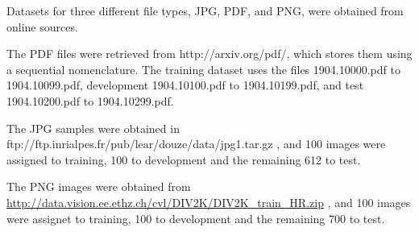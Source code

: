 Datasets for three different file types, JPG, PDF, and PNG, were obtained from online sources.

The PDF files were retrieved from http://arxiv.org/pdf/, which stores them using a sequential nomenclature. The training dataset uses the files 1904.10000.pdf to 1904.10099.pdf, development 1904.10100.pdf to 1904.10199.pdf, and test 1904.10200.pdf to 1904.10299.pdf. 

The JPG samples were obtained in ftp://ftp.inrialpes.fr/pub/lear/douze/data/jpg1.tar.gz  \cite{jegou_hamming_2008}, and 100 images were assigned to training, 100 to development and the remaining 612 to test.

The PNG images were obtained from \url{http://data.vision.ee.ethz.ch/cvl/DIV2K/DIV2K_train_HR.zip} \cite{agustsson_ntire_2017}, and 100 images were assignet to training, 100 to development and the remaining 700 to test.

